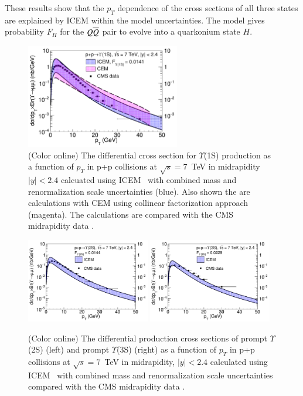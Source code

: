   These results show that the $p_T$ dependence of the cross sections of all three states
  are explained by ICEM within the model uncertainties. The model gives 
probability $F_H$ for the $Q \overline{Q}$ pair to evolve into a 
quarkonium state $H$.
  
\begin{figure}
\centering
\includegraphics[width=0.60\textwidth]{Figures/Fig1_RV1S.pdf}
\caption{(Color online) The differential cross section for $\varUpsilon$(1S) production as a function
  of $p_T$ in p+p collisions at $\sqrt{s} = 7$~TeV in midrapidity $|y|<2.4$ calcuated using
ICEM~\cite{Cheung:2018upe} with combined mass and renormalization scale
uncertainties (blue).  Also shown the are calculations with CEM using collinear
factorization approach (magenta).
 The calculations are compared with the CMS midrapidity data \cite{CMS:2013qur}.}
\label{CMS_1S_pt}
\end{figure}



\begin{figure}
\centering
\includegraphics[width=0.48\textwidth]{Figures/Fig2l_RV2S.pdf}
\includegraphics[width=0.48\textwidth]{Figures/Fig2r_RV3S.pdf}
\caption{(Color online) The differential production cross sections of prompt $\varUpsilon$(2S) (left)
  and prompt $\varUpsilon$(3S) (right) as a function
  of $p_T$ in p+p collisions at $\sqrt{s} = 7$~TeV in midrapidity, $|y|<2.4$
  calculated using ICEM~\cite{Cheung:2018upe} with combined mass and renormalization
  scale uncertainties compared with the CMS midrapidity data \cite{CMS:2013qur}.}
\label{CMS_2S_3S_pt}
\end{figure}








